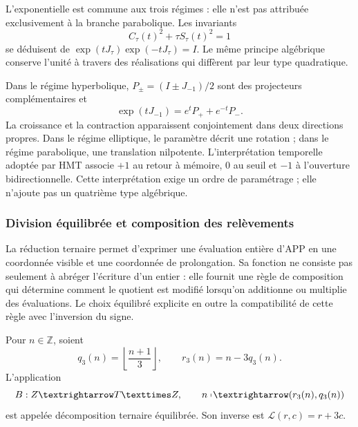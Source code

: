 L'exponentielle est commune aux trois régimes : elle n'est pas attribuée exclusivement à la branche parabolique. Les invariants
\[
 C_\tau(t)^2+\tau S_\tau(t)^2=1
\]
se déduisent de \(\exp(tJ_\tau)\exp(-tJ_\tau)=I\). Le même principe algébrique conserve l'unité à travers des réalisations qui diffèrent par leur type quadratique.

Dans le régime hyperbolique, \(P_\pm=(I\pm J_{-1})/2\) sont des projecteurs complémentaires et
\[
 \exp(tJ_{-1})=e^tP_++e^{-t}P_-.
\]
La croissance et la contraction apparaissent conjointement dans deux directions propres. Dans le régime elliptique, le paramètre décrit une rotation ; dans le régime parabolique, une translation nilpotente. L'interprétation temporelle adoptée par HMT associe \(+1\) au retour à mémoire, \(0\) au seuil et \(-1\) à l'ouverture bidirectionnelle. Cette interprétation exige un ordre de paramétrage ; elle n'ajoute pas un quatrième type algébrique.


\subsubsection{Division équilibrée et composition des relèvements}
\label{x_reciprocidad:trit-ampl-div-balanceada}

La réduction ternaire permet d'exprimer une évaluation entière d'APP en une
coordonnée visible et une coordonnée de prolongation. Sa fonction ne consiste
pas seulement à abréger l'écriture d'un entier : elle fournit une règle de
composition qui détermine comment le quotient est modifié lorsqu'on additionne ou
multiplie des évaluations. Le choix équilibré explicite en outre la
compatibilité de cette règle avec l'inversion du signe.

\begin{definition}
\label{x_reciprocidad:trit-ampl-def-coordenadas}
Pour \(n\in\mathbb Z\), soient
\[
 q_3(n)=\left\lfloor\frac{n+1}{3}\right\rfloor,\qquad
 r_3(n)=n-3q_3(n).
\]
L'application
\[
 \mathcal B:\mathbb Z\longrightarrow\TRIT\times\mathbb Z,\qquad
 n\longmapsto(r_3(n),q_3(n))
\]
est appelée décomposition ternaire équilibrée. Son inverse est
\(\mathcal L(r,c)=r+3c\).
\end{definition}

